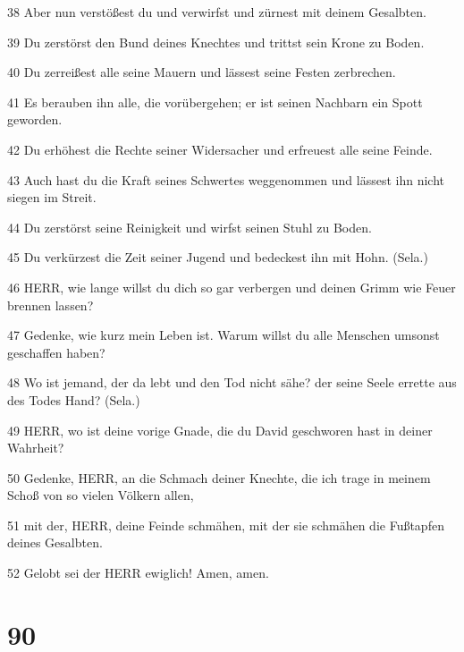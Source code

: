 \par 38 Aber nun verstößest du und verwirfst und zürnest mit deinem Gesalbten.
\par 39 Du zerstörst den Bund deines Knechtes und trittst sein Krone zu Boden.
\par 40 Du zerreißest alle seine Mauern und lässest seine Festen zerbrechen.
\par 41 Es berauben ihn alle, die vorübergehen; er ist seinen Nachbarn ein Spott geworden.
\par 42 Du erhöhest die Rechte seiner Widersacher und erfreuest alle seine Feinde.
\par 43 Auch hast du die Kraft seines Schwertes weggenommen und lässest ihn nicht siegen im Streit.
\par 44 Du zerstörst seine Reinigkeit und wirfst seinen Stuhl zu Boden.
\par 45 Du verkürzest die Zeit seiner Jugend und bedeckest ihn mit Hohn. (Sela.)
\par 46 HERR, wie lange willst du dich so gar verbergen und deinen Grimm wie Feuer brennen lassen?
\par 47 Gedenke, wie kurz mein Leben ist. Warum willst du alle Menschen umsonst geschaffen haben?
\par 48 Wo ist jemand, der da lebt und den Tod nicht sähe? der seine Seele errette aus des Todes Hand? (Sela.)
\par 49 HERR, wo ist deine vorige Gnade, die du David geschworen hast in deiner Wahrheit?
\par 50 Gedenke, HERR, an die Schmach deiner Knechte, die ich trage in meinem Schoß von so vielen Völkern allen,
\par 51 mit der, HERR, deine Feinde schmähen, mit der sie schmähen die Fußtapfen deines Gesalbten.
\par 52 Gelobt sei der HERR ewiglich! Amen, amen.

\chapter{90}

